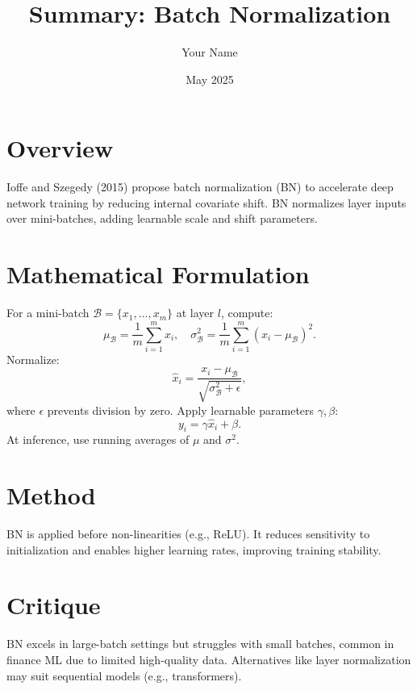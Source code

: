 \documentclass{article}
\begin{document}
\title{Summary: Batch Normalization}
\author{Your Name}
\date{May 2025}
\maketitle

\section{Overview}
Ioffe and Szegedy (2015) propose batch normalization (BN) to accelerate deep network training by reducing internal covariate shift. BN normalizes layer inputs over mini-batches, adding learnable scale and shift parameters.

\section{Mathematical Formulation}
For a mini-batch $\mathcal{B} = \{x_1, \dots, x_m\}$ at layer $l$, compute:
\[
\mu_\mathcal{B} = \frac{1}{m} \sum_{i=1}^m x_i, \quad \sigma_\mathcal{B}^2 = \frac{1}{m} \sum_{i=1}^m (x_i - \mu_\mathcal{B})^2.
\]
Normalize:
\[
\hat{x}_i = \frac{x_i - \mu_\mathcal{B}}{\sqrt{\sigma_\mathcal{B}^2 + \epsilon}},
\]
where $\epsilon$ prevents division by zero. Apply learnable parameters $\gamma, \beta$:
\[
y_i = \gamma \hat{x}_i + \beta.
\]
At inference, use running averages of $\mu$ and $\sigma^2$.

\section{Method}
BN is applied before non-linearities (e.g., ReLU). It reduces sensitivity to initialization and enables higher learning rates, improving training stability.

\section{Critique}
BN excels in large-batch settings but struggles with small batches, common in finance ML due to limited high-quality data. Alternatives like layer normalization may suit sequential models (e.g., transformers).
\end{document}
